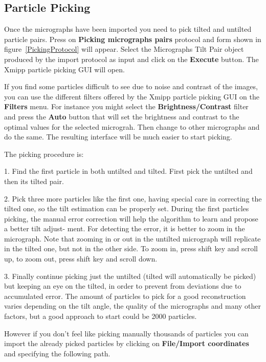 \documentclass[12pt]{article} %
\begin{document}
\subsection{Particle Picking}
Once the micrographs have been imported you need to pick tilted and untilted particle pairs.
Press on \textbf{Picking micrographs pairs} protocol  and form shown in figure~\ref{PickingProtocol} 
will appear. Select the Micrographs Tilt Pair object produced by the import protocol as input and 
click on the \textbf{Execute} button. The Xmipp particle picking GUI will open.

If you find some particles difficult to see due to noise and contrast of the images, you can use the 
different filters offered by the Xmipp particle picking GUI on the \textbf{Filters} menu.
For instance you might select the \textbf{Brightness/Contrast} filter and press the \textbf{Auto} button that will 
set the brightness and contrast to the optimal values for the selected micrograh. Then change to other micrographs 
and do the same. The resulting interface will be much easier to start picking.

The picking procedure is:

1.  Find the first particle in both untilted and tilted. First pick the untilted and then its tilted
pair.

2.  Pick three more particles like the first one, having special care in correcting
the tilted one, so the tilt estimation can be properly set. During the first particles picking,
the manual error correction will help the algorithm to learn and propose a better tilt adjust-
ment. For detecting the error, it is better to zoom in the micrograph. Note that zooming in
or out in the untilted micrograph will replicate in the tilted one, but not in the other side.
To zoom in, press shift key and scroll up, to zoom out, press shift key and scroll down.

3.  Finally continue picking just the untilted (tilted will automatically be picked) but keeping
an eye on the tilted, in order to prevent from deviations due to accumulated error. The amount 
of particles to pick for a good reconstruction varies depending on the tilt angle,
the quality of the micrographs and many other factors, but a good approach to start could
be 2000 particles.

However if you don't feel like picking manually thousands of particles you can import the already picked 
particles by clicking on \textbf{File/Import coordinates} and specifying the following path.
\end{document}
